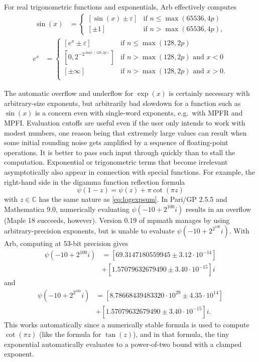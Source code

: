 \documentclass[10pt,journal,compsoc,cspaper]{IEEEtran}
\begin{document}
For real trigonometric functions and exponentials,
Arb effectively computes
\begin{align*}
 \sin(x) &=
  \begin{cases}
   [\sin(x) \pm \varepsilon]        & \text{if } n \le \max(65536, 4p) \\
   [\pm 1]        & \text{if } n > \max(65536, 4p),
  \end{cases}
\end{align*}
\begin{align*}
 e^x &=
  \begin{cases}
   [e^x \pm \varepsilon]                            & \text{if } n \le \max(128, 2p) \\
   [0,2^{-2^{\max(128, 2p)}}]       & \text{if } n > \max(128, 2p) \text{ and } x < 0 \\
   [\pm \infty]                         & \text{if } n > \max(128, 2p) \text{ and } x > 0. \\
  \end{cases}
\end{align*}

The automatic overflow and underflow for $\exp(x)$ is certainly necessary
with arbitrary-size exponents,
but arbitrarily bad slowdown for a function such as $\sin(x)$ is a concern even
with single-word exponents, e.g.\ with MPFR and MPFI.
Evaluation cutoffs are useful even if the user only intends
to work with modest numbers, one reason being
that extremely large values can result
when some initial rounding noise
gets amplified by a sequence of floating-point operations.
It is better to pass such input through quickly than to stall the computation. 
Exponential or trigonometric terms that become
irrelevant asymptotically also appear in connection with
special functions. For example, the
right-hand side in the digamma function reflection formula
$$\psi(1-z) = \psi(z) + \pi \cot(\pi z)$$
with $z \in \mathbb{C}$ has the same nature as \eqref{eq:logexpsum}.
In Pari/GP 2.5.5 and Mathematica 9.0, numerically evaluating
$\psi(-10 + 2^{100} i)$ results in an overflow
(Maple 18 succeeds, however).
Version 0.19 of mpmath manages by using arbitrary-precision exponents,
but is unable to evaluate $\psi(-10 + 2^{2^{100}} i)$.
With Arb, computing at 53-bit precision gives
\begin{align*}
\psi(-10 + 2^{100} i) &= [69.3147180559945 \pm 3.12 \cdot 10^{-14}] \\
                      &+ [1.57079632679490 \pm 3.40 \cdot 10^{-15}] i
\end{align*}
and
\begin{align*}
\psi(-10 + 2^{2^{100}} i) &= [8.78668439483320 \cdot 10^{29} \pm 4.35 \cdot 10^{14}] \\
                          &+ [1.57079632679490 \pm 3.40 \cdot 10^{-15}] i.
\end{align*}
This works automatically since a numerically stable formula
is used to compute $\cot(\pi z)$ (like the formula for $\tan(z)$),
and in that formula, the tiny exponential automatically
evaluates to a power-of-two bound with a clamped exponent.
\end{document}
